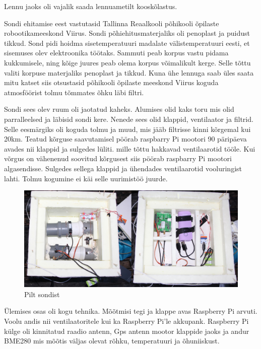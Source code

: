\documentclass{trkut}%
\begin{document}
Lennu jaoks oli vajalik saada lennuametilt kooskõlastus.

Sondi ehitamise eest vastutasid Tallinna Reaalkooli põhikooli õpilaste robootikameeskond Viirus. Sondi põhiehitusmaterjaliks oli penoplast ja puidust tikkud. Sond pidi hoidma sisetemperatuuri madalate välistemperatuuri eesti, et sisemuses olev elektroonika töötaks. Sammuti peab korpus vastu pidama kukkumisele, ning kõige juures peab olema korpus võimalikult kerge. Selle tõttu valiti korpuse materjaliks penoplast ja tikkud. Kuna ühe lennuga saab üles saata mitu katset siis otsustasid põhikooli õpilaste meeskond Viirus koguda atmosföörist tolmu tõmmates õhku läbi filtri. 

Sondi sees olev ruum oli jaotatud kaheks. Alumises olid kaks toru mis olid parralleelsed ja läbisid sondi kere. Nenede sees olid klappid, ventilaator ja filtrid. Selle eesmärgiks oli koguda tolmu ja muud, mis jääb filtrisse kinni kõrgemal kui 20km. Teatud kõrguse saavutamisel pöörab raspbarry Pi mootori \SI{90}{\textdegree} päripäeva avades nii klappid ja sulgedes lüliti. mille tõttu hakkavad ventilaarotid tööle. Kui võrgus on vähenenud soovitud kõrgusest siis pöörab raspbarry Pi mootori algasendisse. Sulgedes sellega klappid ja ühendades ventilaarotid vooluringist lahti. Tolmu kogumine ei käi selle uurimistöö juurde.

\begin{figure}[h]
	\includegraphics[width=1\textwidth]{PicGra/sond2korrus.jpg}
	\caption{Pilt sondist}
	\label{sond}
\end{figure}

Ülemises osas oli kogu tehnika. Mõõtmisi tegi ja klappe avas Raspberry Pi arvuti. Voolu andis nii ventilaatoritele kui ka Raspberry Pi'le akkupank. Raspberry Pi külge oli kinnitatud raadio antenn, Gps antenn mootor klappide jaoks ja andur BME280 mis mõõtis väljas olevat rõhku, temperatuuri ja õhuniiskust.
\end{document}
